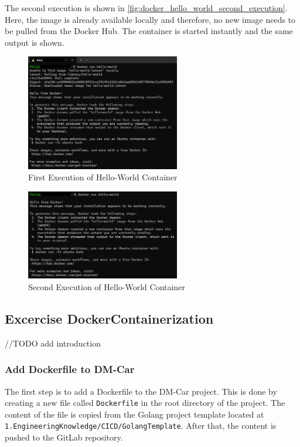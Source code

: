 The second execution is shown in \autoref*{fig:docker_hello_world_second_execution}.
Here, the image is already available locally and therefore, no new image needs to be pulled from the Docker Hub.
The container is started instantly and the same output is shown.

\begin{figure}
    \centering
    \includegraphics[width=0.6\textwidth]{figures/microservices/dmCar/ms_dmCar_dockerHelloWorldFirstExecution.png}
    \caption{First Execution of Hello-World Container}
    \label{fig:docker_hello_world_first_execution}
\end{figure}

\begin{figure}
    \centering
    \includegraphics[width=0.6\textwidth]{figures/microservices/dmCar/ms_dmCar_dockerHelloWorldSecondExecution.png}
    \caption{Second Execution of Hello-World Container}
    \label{fig:docker_hello_world_second_execution}
\end{figure}


\subsection{Excercise DockerContainerization}
//TODO add introduction
\subsubsection*{Add Dockerfile to DM-Car}
The first step is to add a Dockerfile to the DM-Car project.
This is done by creating a new file called \texttt{Dockerfile} in the root directory of the project.
The content of the file is copied from the Golang project template located at \texttt{1.EngineeringKnowledge/CICD/GolangTemplate}.
After that, the content is pushed to the GitLab repository.

